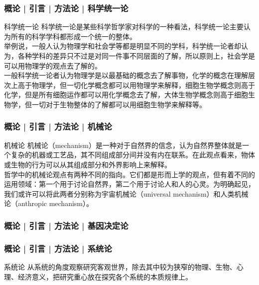 \begin{frame}[label=current]
  \frametitle{概论 | 引言 | 方法论 | 科学统一论}
  \begin{block}{科学统一论}
科学统一论是某些科学哲学家对科学的一种看法，科学统一论主要认为所有的科学学科都形成一个统一的整体。\\
\vspace{1em}
举例说，一般人认为物理学和社会学等都是明显不同的学科，科学统一论者却认为，各种学科的差异只不过是对同一件事不同层面的了解，所以原则上，社会学是可以用物理学的观点去了解的。\\
\vspace{1em}
一般科学统一论者认为物理学是以最基础的概念去了解事物，化学的概念在理解层次上高于物理学，但一切化学概念都可以用物理学来解释，细胞生物学概念则高于化学，但是所有细胞运作都可以用化学概念去了解，大体生物学概念则高于细胞生物学，但一切对于生物整体的了解都可以用细胞生物学来解释等。
  \end{block}
\end{frame}

\begin{frame}[label=current]
  \frametitle{概论 | 引言 | 方法论 | 机械论}
  \begin{block}{机械论}
机械论（mechanism）是一种对于自然界的信念，认为自然界整体就是一个复杂的机器或工艺品，其不同组成部分间并没有内在联系。在此观点看来，物体或生物的行为可以从其组成部分和外界影响上来解释。\\
\vspace{1em}
哲学中的机械论观点有两种不同的指向。它们都是形而上学的观点，但有着不同的运用领域：第一个用于讨论自然界，第二个用于讨论人和人的心灵。为明确起见，我们或许可以将此两者分别称为宇宙机械论（universal mechanism）和人类机械论（anthropic mechanism）。
  \end{block}
\end{frame}

\begin{frame}[label=current]
  \frametitle{概论 | 引言 | 方法论 | 基因决定论}
\end{frame}

\begin{frame}[label=current]
  \frametitle{概论 | 引言 | 方法论 | 系统论}
  \begin{block}{系统论}
从系统的角度观察研究客观世界，除去其中较为狭窄的物理、生物、心理、经济意义，把研究重心放在探究各个系统的本质规律上。
  \end{block}
\end{frame}

